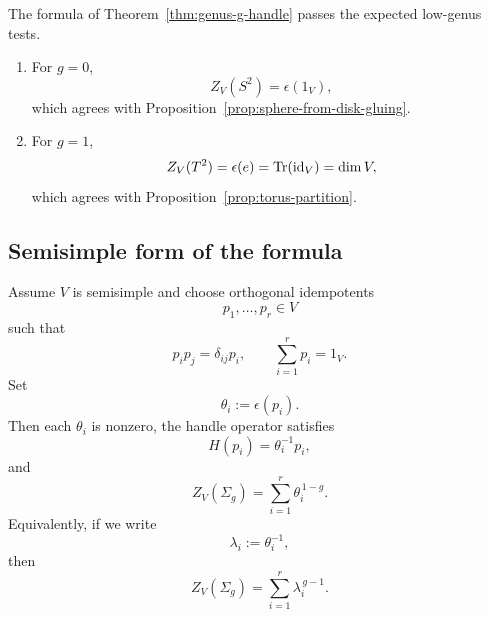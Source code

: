 \begin{remark}\label{rem:small-genus-checks}
The formula of Theorem~\ref{thm:genus-g-handle} passes the expected low-genus tests.
\begin{enumerate}
\item For $g=0$,
\begin{equation}\label{eq:sphere-check}
Z_V(S^2)=\epsilon(1_V),
\end{equation}
which agrees with Proposition~\ref{prop:sphere-from-disk-gluing}.
\item For $g=1$,
\begin{equation}\label{eq:torus-check}
Z_V(T^2)=\epsilon(e)=\operatorname{Tr}(\operatorname{id}_V)=\dim V,
\end{equation}
which agrees with Proposition~\ref{prop:torus-partition}.
\end{enumerate}
\end{remark}

\subsection{Semisimple form of the formula}

\begin{proposition}\label{prop:idempotent-genus}
Assume $V$ is semisimple and choose orthogonal idempotents
\begin{equation}\label{eq:orthogonal-idempotents}
p_1,\dots,p_r \in V
\end{equation}
such that
\begin{equation}\label{eq:idempotent-relations}
p_i p_j = \delta_{ij} p_i,
\qquad
\sum_{i=1}^r p_i = 1_V.
\end{equation}
Set
\begin{equation}\label{eq:theta-i}
\theta_i := \epsilon(p_i).
\end{equation}
Then each $\theta_i$ is nonzero, the handle operator satisfies
\begin{equation}\label{eq:H-idempotent}
H(p_i)=\theta_i^{-1} p_i,
\end{equation}
and
\begin{equation}\label{eq:genus-semismple}
Z_V(\Sigma_g)=\sum_{i=1}^r \theta_i^{\,1-g}.
\end{equation}
Equivalently, if we write
\begin{equation}\label{eq:lambda-i}
\lambda_i := \theta_i^{-1},
\end{equation}
then
\begin{equation}\label{eq:genus-semismple-lambda}
Z_V(\Sigma_g)=\sum_{i=1}^r \lambda_i^{\,g-1}.
\end{equation}
\end{proposition}

